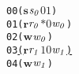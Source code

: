 \newcommand{\epsnd}{\textit{$N_s$}}
\newcommand{\eprcv}{\textit{$N_r$}}
\newcommand{\epwait}{\textit{$P_r$}}
\newcommand{\epbarrier}{\textit{$P_b$}}
\newcommand{\frm}{\textit{frm}}
\newcommand{\vbot}{\textit{v$-\bot$}}
\newcommand{\status}{\textit{s}}
\newcommand{\error}{\ensuremath{\mathbf{error}}}
\newcommand{\aidmap}{\textit{A}}
\newcommand{\thread}{\ensuremath{\mathit{p}}}
\newcommand{\aid}{\ensuremath{\mathit{x}}}
\newcommand{\num}{\ensuremath{\mathit{v}}}
\newcommand{\rcvp}{\ensuremath{\mathit{pt}}}
\newcommand{\npro}{\ensuremath{\mathit{n}}}
\newcommand{\cmd}{\ensuremath{\mathit{e}}}
\newcommand{\op}{\ensuremath{\mathit{op}}}
\newcommand{\comm}{\ensuremath{\mathit{cm}}}
\newcommand{\applyop}{\ensuremath{\mathrm{op}}}
\newcommand{\wait}{\ensuremath{\mathbf{w}}}
\newcommand{\sendi}{\ensuremath{\mathbf{s}}}
\newcommand{\recvi}{\ensuremath{\mathbf{r}}}
\newcommand{\barrier}{\ensuremath{\mathbf{b}}}
\newcommand{\traceentry}{\ensuremath{\sigma}}
\newcommand{\movelist}{\ensuremath{\delta}}
\newcommand{\ep}{\ensuremath{\mathbf{\gamma}}}
\newcommand{\src}{\ensuremath{\alpha}}
\newcommand{\dst}{\ensuremath{\beta}}
\newcommand{\true}{\ensuremath{\mathbf{true}}}
\newcommand{\false}{\ensuremath{\mathbf{false}}}
\newcommand{\match}{\ensuremath{\mathrm{m}}}
\newcommand{\matchl}{\ensuremath{\mathrm{match}}}
\newcommand{\findrecv}{\ensuremath{\mathrm{search_r}}}
\newcommand{\smt}{\ensuremath{\mathit{smt}}}

\newcommand{\statuschange}{\left\{ \begin{array}{ll}  \status &\ \mathrm{if}\ |\epsnd(\dst)(\src)|>0\\
   \mathit{error} &\  \mathrm{otherwise}\end{array}\right .}

\newcommand{\reduce}[1]{\ensuremath{\rightarrow_{#1}}}
\newcommand{\reduceK}[1]{\ensuremath{\rightarrow_{#1}^{*}}}
\newcommand{\reduceN}[1]{\ensuremath{\dashrightarrow_{#1}}}
\newcommand{\reduceNK}[1]{\ensuremath{\dashrightarrow_{#1}^{*}}}
\newcommand{\mt}{\ensuremath{mt}}
\newcommand{\trace}{\ensuremath{\mathit{trace}}}
\newcommand{\movebot}{\ensuremath{\mathit{m}}}
\newcommand{\ret}{\ensuremath{\mathbf{ret}}}


\newsavebox{\boxTZero}
\begin{lrbox}{\boxTZero}
\begin{minipage}[t]{0.65\linewidth}
\large
\begin{alltt}
00 (\(\mathbf{s}\) \(\mathit{s\sb{0}}\) \(\mathit{0 1}\))
01 (\(\mathbf{r}\) \(\mathit{r\sb{0}}\) \(\mathit{\ast 0}\) \(\mathit{w\sb{0}}\))
02 (\(\mathbf{w}\) \(\mathit{w\sb{0}}\)) 
03 \underline{(\(\mathbf{r}\) \(\mathit{r\sb{1}}\) \(\mathit{1 0}\) \(\mathit{w\sb{1}}\))}
04 (\(\mathbf{w}\) \(\mathit{w\sb{1}}\))
\end{alltt}
\end{minipage}
\end{lrbox}

